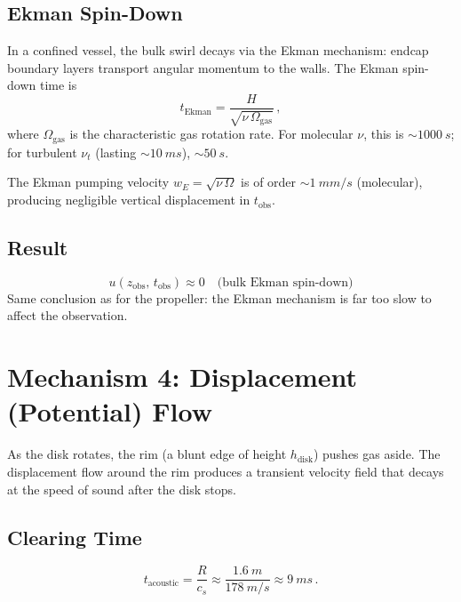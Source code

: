 \documentclass[11pt,a4paper]{article}
\begin{document}
\subsection{Ekman Spin-Down}

In a confined vessel, the bulk swirl decays via the Ekman mechanism:
endcap boundary layers transport angular momentum to the walls. The
Ekman spin-down time is
\begin{equation}
  t_\mathrm{Ekman} = \frac{H}{\sqrt{\nu\,\Omega_\mathrm{gas}}}\,,
\end{equation}
where $\Omega_\mathrm{gas}$ is the characteristic gas rotation rate.
For molecular $\nu$, this is $\sim\SI{1000}{s}$; for turbulent $\nu_t$
(lasting $\sim\SI{10}{ms}$), $\sim\SI{50}{s}$.

The Ekman pumping velocity $w_E = \sqrt{\nu\,\Omega}$ is of order
$\sim\SI{1}{mm/s}$ (molecular), producing negligible vertical
displacement in $t_\mathrm{obs}$.

\subsection{Result}

\begin{equation}
  \boxed{u(z_\mathrm{obs},\, t_\mathrm{obs})
    \approx 0 \quad \text{(bulk Ekman spin-down)}}
\end{equation}
Same conclusion as for the propeller: the Ekman mechanism is far too
slow to affect the observation.


\section{Mechanism 4: Displacement (Potential) Flow}
\label{sec:potential}

As the disk rotates, the rim (a blunt edge of height $h_\mathrm{disk}$)
pushes gas aside. The displacement flow around the rim produces a
transient velocity field that decays at the speed of sound after the
disk stops.

\subsection{Clearing Time}

\begin{equation}
  t_\mathrm{acoustic} = \frac{R}{c_s}
    \approx \frac{\SI{1.6}{m}}{\SI{178}{m/s}}
    \approx \SI{9}{ms}\,.
\end{equation}
\end{document}
